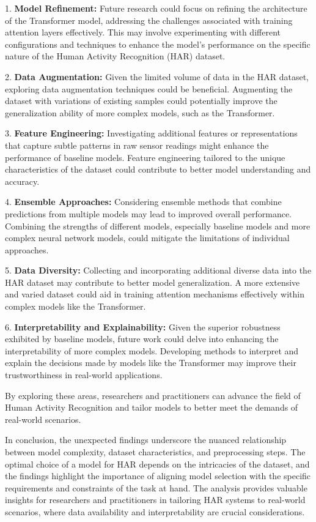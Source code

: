 \documentclass[conference]{IEEEtran}
\begin{document}
1. \textbf{Model Refinement:} Future research could focus on refining the architecture of the Transformer model, addressing the challenges associated with training attention layers effectively. This may involve experimenting with different configurations and techniques to enhance the model's performance on the specific nature of the Human Activity Recognition (HAR) dataset.

2. \textbf{Data Augmentation:} Given the limited volume of data in the HAR dataset, exploring data augmentation techniques could be beneficial. Augmenting the dataset with variations of existing samples could potentially improve the generalization ability of more complex models, such as the Transformer.

3. \textbf{Feature Engineering:} Investigating additional features or representations that capture subtle patterns in raw sensor readings might enhance the performance of baseline models. Feature engineering tailored to the unique characteristics of the dataset could contribute to better model understanding and accuracy.

4. \textbf{Ensemble Approaches:} Considering ensemble methods that combine predictions from multiple models may lead to improved overall performance. Combining the strengths of different models, especially baseline models and more complex neural network models, could mitigate the limitations of individual approaches.

5. \textbf{Data Diversity:} Collecting and incorporating additional diverse data into the HAR dataset may contribute to better model generalization. A more extensive and varied dataset could aid in training attention mechanisms effectively within complex models like the Transformer.

6. \textbf{Interpretability and Explainability:} Given the superior robustness exhibited by baseline models, future work could delve into enhancing the interpretability of more complex models. Developing methods to interpret and explain the decisions made by models like the Transformer may improve their trustworthiness in real-world applications.

By exploring these areas, researchers and practitioners can advance the field of Human Activity Recognition and tailor models to better meet the demands of real-world scenarios.

In conclusion, the unexpected findings underscore the nuanced relationship between model complexity, dataset characteristics, and preprocessing steps. The optimal choice of a model for HAR depends on the intricacies of the dataset, and the findings highlight the importance of aligning model selection with the specific requirements and constraints of the task at hand. The analysis provides valuable insights for researchers and practitioners in tailoring HAR systems to real-world scenarios, where data availability and interpretability are crucial considerations.
\end{document}
